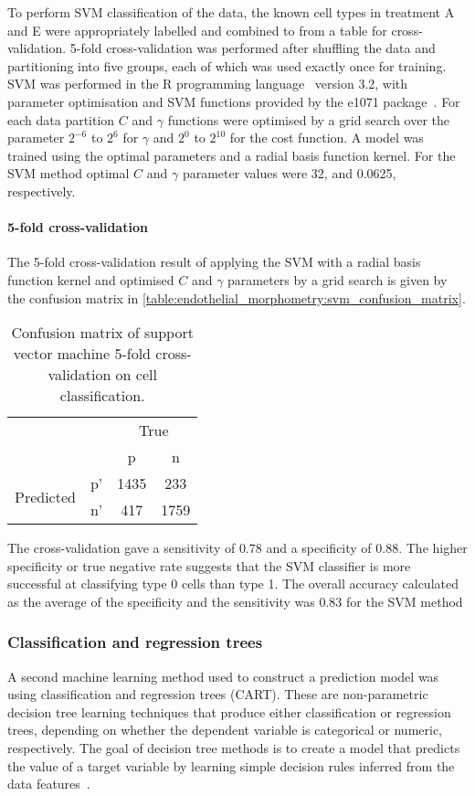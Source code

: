 To perform SVM classification of the data, the known cell types in treatment A and E were appropriately labelled and combined to from a table for cross-validation. 5-fold cross-validation was performed after shuffling the data and partitioning into five groups, each of which was used exactly once for training. SVM was performed in the R programming language~\cite{RCoreTeam2014} version 3.2, with parameter optimisation and SVM functions provided by the e1071 package~\cite{Hornik2015}. For each data partition $C$ and $\gamma$ functions were optimised by a grid search over the parameter $2^{-6}$ to $2^{6}$ for $\gamma$ and $2^{0}$ to $2^{10}$ for the cost function. A model was trained using the optimal parameters and a radial basis function kernel. For the SVM method optimal $C$ and $\gamma$ parameter values were 32, and 0.0625, respectively.

\paragraph{5-fold cross-validation}
The 5-fold cross-validation result of applying the SVM with a radial basis function kernel and  optimised $C$ and $\gamma$ parameters by a grid search is given by the confusion matrix in \autoref{table:endothelial_morphometry:svm_confusion_matrix}.

\begin{table}[htbp]
\caption[Confusion matrix of SVM cross-validation on cell classification]{Confusion matrix of support vector machine 5-fold cross-validation on cell classification.}
\label{table:endothelial_morphometry:svm_confusion_matrix}
\centering
\begin{tabular}{cc|cc}
	\multicolumn{2}{c}{}&\multicolumn{2}{c}{True}\\
	\multicolumn{2}{c|}{}& p & n\\
	\cline{2-4}
	\multirow{2}{*}{Predicted}& p' & 1435 & 233\\ & n' & 417 & 1759\\
\end{tabular}
\end{table}

The cross-validation gave a sensitivity of $0.78$ and a specificity of $0.88$. The higher specificity or true negative rate suggests that the SVM classifier is more successful at classifying type 0 cells than type 1. The overall accuracy calculated as the average of the specificity and the sensitivity was $0.83$ for the SVM method

\subsubsection{Classification and regression trees}
A second machine learning method used to construct a prediction model was using classification and regression trees (CART). These are non-parametric decision tree learning techniques that produce either classification or regression trees, depending on whether the dependent variable is categorical or numeric, respectively. The goal of decision tree methods is to create a model that predicts the value of a target variable by learning simple decision rules inferred from the data features~\cite{Breiman1984}.

